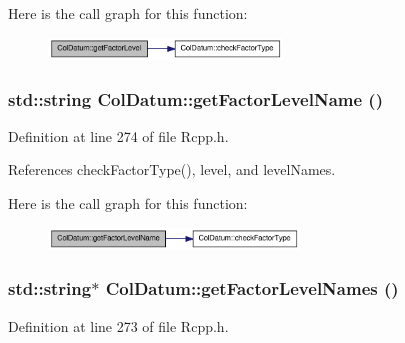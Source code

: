 Here is the call graph for this function:\nopagebreak
\begin{figure}[H]
\begin{center}
\leavevmode
\includegraphics[width=176pt]{classColDatum_adf3716db9f3483f3cd255a4c05823479_cgraph}
\end{center}
\end{figure}
\hypertarget{classColDatum_a012df5970083052c2348cbda9ed646bb}{
\subsubsection[{getFactorLevelName}]{\setlength{\rightskip}{0pt plus 5cm}std::string ColDatum::getFactorLevelName ()}}
\label{classColDatum_a012df5970083052c2348cbda9ed646bb}


Definition at line 274 of file Rcpp.h.

References checkFactorType(), level, and levelNames.

Here is the call graph for this function:\nopagebreak
\begin{figure}[H]
\begin{center}
\leavevmode
\includegraphics[width=189pt]{classColDatum_a012df5970083052c2348cbda9ed646bb_cgraph}
\end{center}
\end{figure}
\hypertarget{classColDatum_a4376ad852efcf177fad6f168a8f44877}{
\subsubsection[{getFactorLevelNames}]{\setlength{\rightskip}{0pt plus 5cm}std::string$\ast$ ColDatum::getFactorLevelNames ()}}
\label{classColDatum_a4376ad852efcf177fad6f168a8f44877}


Definition at line 273 of file Rcpp.h.

